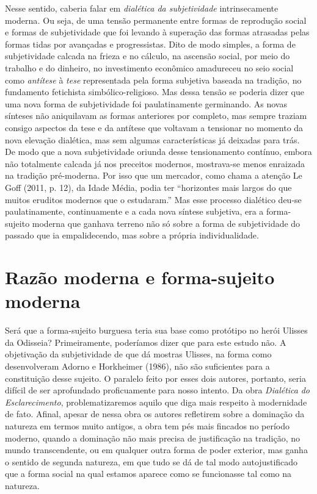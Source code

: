 Nesse sentido, caberia falar em \emph{dialética da subjetividade}
intrinsecamente moderna\emph{.} Ou seja, de uma tensão permanente entre
formas de reprodução social e formas de subjetividade que foi levando à
superação das formas atrasadas pelas formas tidas por avançadas e
progressistas. Dito de modo simples, a forma de subjetividade calcada na
frieza e no cálculo, na ascensão social, por meio do trabalho e do
dinheiro, no investimento econômico amadureceu no seio social como
\emph{antítese} à \emph{tese} representada pela forma subjetiva baseada
na tradição, no fundamento fetichista simbólico-religioso. Mas dessa
tensão se poderia dizer que uma nova forma de subjetividade foi
paulatinamente germinando. As novas sínteses não aniquilavam as formas
anteriores por completo, mas sempre traziam consigo aspectos da tese e
da antítese que voltavam a tensionar no momento da nova elevação
dialética, mas sem algumas características já deixadas para trás. De
modo que a nova subjetividade oriunda desse tensionamento contínuo,
embora não totalmente calcada já nos preceitos modernos, mostrava-se
menos enraizada na tradição pré-moderna. Por isso que um mercador, como
chama a atenção Le Goff (2011, p. 12), da Idade Média, podia ter
``horizontes mais largos do que muitos eruditos modernos que o
estudaram.'' Mas esse processo dialético deu-se paulatinamente,
continuamente e a cada nova síntese subjetiva, era a forma-sujeito
moderna que ganhava terreno não só sobre a forma de subjetividade do
passado que ia empalidecendo, mas sobre a própria individualidade.

\section{Razão moderna e forma-sujeito moderna}

Será que a forma-sujeito burguesa teria sua base como protótipo no herói
Ulisses da Odisseia? Primeiramente, poderíamos dizer que para este
estudo não. A objetivação da subjetividade de que dá mostras Ulisses, na
forma como desenvolveram Adorno e Horkheimer (1986), não são suficientes
para a constituição desse sujeito. O paralelo feito por esses dois
autores, portanto, seria difícil de ser aprofundado proficuamente para
nosso intento. Da obra \emph{Dialética} \emph{do} \emph{Esclarecimento},
problematizaremos aquilo que diga mais respeito à modernidade de fato.
Afinal, apesar de nessa obra os autores refletirem sobre a dominação da
natureza em termos muito antigos, a obra tem pés mais fincados no
período moderno, quando a dominação não mais precisa de justificação na
tradição, no mundo transcendente, ou em qualquer outra forma de poder
exterior, mas ganha o sentido de segunda natureza, em que tudo se dá de
tal modo autojustificado que a forma social na qual estamos aparece como
se funcionasse tal como na natureza.

